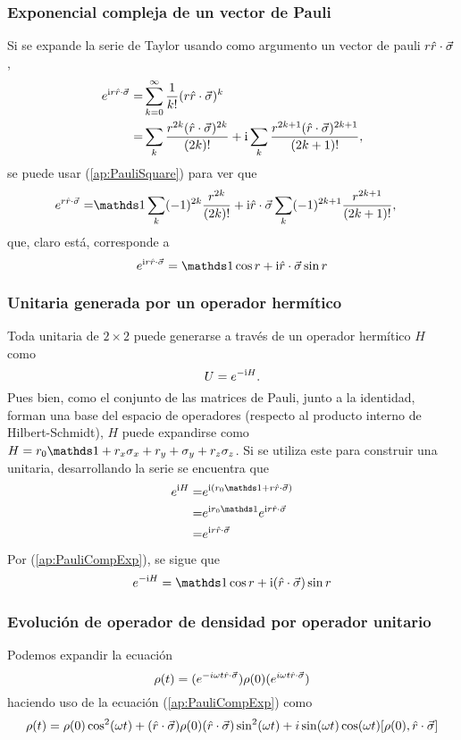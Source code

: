 \subsubsection{Exponencial compleja de un vector de Pauli}
Si se expande la serie de Taylor usando como argumento un vector de pauli $r\hat{r}\cdot\vec{\sigma}$,
\begin{align}
    e^{\text{i} r\hat{r}\cdot\vec{\sigma}}=&\sum_{k=0}^{\infty}\frac{1}{k!}(r\hat{r}\cdot\vec{\sigma})^k\nonumber\\
    =&\sum_{k}\frac{r^{2k}(\hat{r}\cdot\vec{\sigma})^{2k}}{(2k)!}+\text{i} \sum_{k}\frac{r^{2k+1}(\hat{r}\cdot\vec{\sigma})^{2k+1}}{(2k+1)!},\nonumber
\end{align}
se puede usar (\ref{ap:PauliSquare}) para ver que
\begin{align}
    e^{r\paulivec{r}}=&\Id\sum_{k}(-1)^{2k}\frac{r^{2k}}{(2k)!}+\rmi \paulivec{r}\sum_{k}(-1)^{2k+1}\frac{r^{2k+1}}{(2k+1)!},\nonumber
\end{align}
que, claro está, corresponde a
\begin{equation}\label{ap:PauliCompExp}
    e^{\rmi r\paulivec{r}}=\Id\cos{r}+\rmi \paulivec{r}\sin{r}
\end{equation}
\subsubsection{Unitaria generada por un operador hermítico}
Toda unitaria de $2\times 2$ puede generarse a través de un operador hermítico $H$ como
\begin{equation}
    U=e^{-\text{i} H}.\nonumber
\end{equation}
Pues bien, como el conjunto de las matrices de Pauli, junto a la identidad, forman una base del espacio de operadores (respecto al producto interno de Hilbert-Schmidt), $H$ puede expandirse como $H=r_{0}\Id+r_{x}\pauli{x}+r_{y}+\pauli{y}+r_{z}\pauli{z}$. Si se utiliza este para construir una unitaria, desarrollando la serie se encuentra que
\begin{align}
    e^{\rmi H}=&e^{\rmi(r_{0}\Id+r\paulivec{r})}\nonumber\\
    =&e^{\rmi r_{0}\Id}e^{\rmi r\paulivec{r}}\nonumber\\
    =&e^{\rmi r\paulivec{r}}\nonumber
\end{align}
Por (\ref{ap:PauliCompExp}), se sigue que 
\begin{equation}
    e^{-\rmi H}=\Id \cos{r}+\rmi(\paulivec{r})\sin{r}
\end{equation}


\subsubsection{Evolución de operador de densidad por operador unitario}
Podemos expandir la ecuación
\begin{equation}
    \rho(t)=(e^{-i\omega t \hat{r}\cdot\vec{\sigma}})\rho(0)(e^{i\omega t \hat{r}\cdot\vec{\sigma}})\nonumber
\end{equation}
haciendo uso de la ecuación (\ref{ap:PauliCompExp}) como
\begin{equation}
    \rho(t)=\rho(0)\cos^{2}(\omega t)+(\hat{r}\cdot\vec{\sigma})\rho(0)(\hat{r}\cdot\vec{\sigma})\sin^{2}(\omega t)+i\sin(\omega t)\cos(\omega t)[\rho(0),\hat{r}\cdot\vec{\sigma}]
\end{equation}